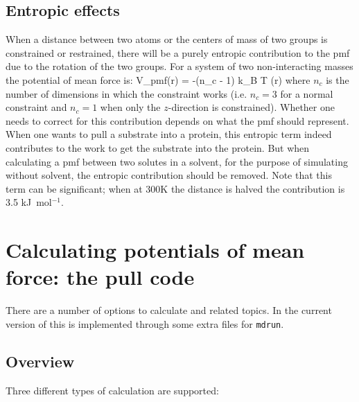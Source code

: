 \subsection{Entropic effects}
When a distance between two atoms or the centers of mass of two groups
is constrained or restrained, there will be a purely entropic contribution
to the pmf due to the rotation of the two groups.
For a system of two non-interacting masses the potential of mean force is:
\beq
V_{pmf}(r) = -(n_c - 1) k_B T \log(r)
\eeq
where $n_c$ is the number of dimensions in which the constraint works
(i.e. $n_c=3$ for a normal constraint and $n_c=1$ when only
the $z$-direction is constrained).
Whether one needs to correct for this contribution depends on what
the pmf should represent. When one wants to pull a substrate
into a protein, this entropic term indeed contributes to the work to
get the substrate into the protein. But when calculating a pmf
between two solutes in a solvent, for the purpose of simulating
without solvent, the entropic contribution should be removed.
Note that this term can be significant; when at 300K the distance is halved
the contribution is 3.5 kJ~mol$^{-1}$.

\section{Calculating potentials of mean force: the pull code}
\label{sec:pull}
There are a number of options to calculate 
and related topics. In the current version of {\gromacs} this is
implemented through some extra files for {\tt mdrun}. 

\subsection{Overview}
Three different types of calculation are supported:

